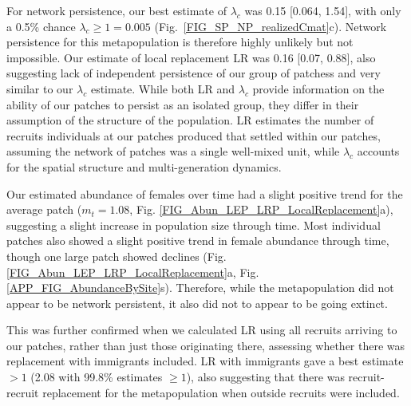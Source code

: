 \documentclass[12pt, oneside]{article}   	%
\begin{document}
For network persistence, our best estimate of $\lambda_{c}$ was 0.15 [0.064, 1.54], with only a 0.5\% chance $\lambda_{c} \geq 1 = 0.005$ (Fig.\ \ref{FIG_SP_NP_realizedCmat}c). Network persistence for this metapopulation is therefore highly unlikely but not impossible. Our estimate of local replacement LR was 0.16 [0.07, 0.88], also suggesting lack of independent persistence of our group of patchess and very similar to our $\lambda_{c}$ estimate. While both LR and $\lambda_{c}$ provide information on the ability of our patches to persist as an isolated group, they differ in their assumption of the structure of the population. LR estimates the number of recruits individuals at our patches produced that settled within our patches, assuming the network of patches was a single well-mixed unit, while $\lambda_{c}$ accounts for the spatial structure and multi-generation dynamics. %

Our estimated abundance of females over time had a slight positive trend for the average patch ($m_t = 1.08$, Fig. \ref{FIG_Abun_LEP_LRP_LocalReplacement}a), suggesting a slight increase in population size through time. Most individual patches also showed a slight positive trend in female abundance through time, though one large patch showed declines (Fig. \ref{FIG_Abun_LEP_LRP_LocalReplacement}a, Fig. \ref{APP_FIG_AbundanceBySite}s). Therefore, while the metapopulation did not appear to be network persistent, it also did not to appear to be going extinct. 

This was further confirmed when we calculated LR using all recruits arriving to our patches, rather than just those originating there, assessing whether there was replacement with immigrants included. LR with immigrants gave a best estimate $> 1$ (2.08 with 99.8\% estimates $\geq 1$), also suggesting that there was recruit-recruit replacement for the metapopulation when outside recruits were included.  %

\end{document}
